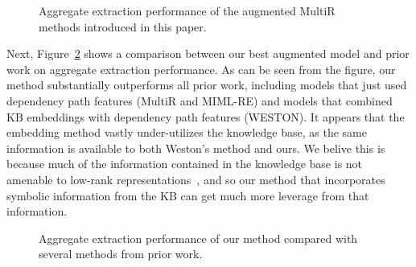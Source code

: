 \documentclass[11pt,a4paper]{article}
\newcommand{\figref}[1]{Figure~\ref{fig:#1}}
\begin{document}
\begin{figure}
  \centering
  \caption{Aggregate extraction performance of the augmented MultiR methods
  introduced in this paper.}
  \label{fig:our-comparison}
\end{figure}

Next, \figref{prior-work-comparison} shows a comparison between our best
augmented model and prior work on aggregate extraction performance.  As can be
seen from the figure, our method substantially outperforms all prior work,
including models that just used dependency path features (MultiR and MIML-RE)
and models that combined KB embeddings with dependency path features (WESTON).
It appears that the embedding method vastly under-utilizes the knowledge base,
as the same information is available to both Weston's method and ours.  We
belive this is because much of the information contained in the knowledge base
is not amenable to low-rank representations~\cite{nickel-2014-are}, and so our
method that incorporates symbolic information from the KB can get much more
leverage from that information.

\begin{figure}
  \centering
  \caption{Aggregate extraction performance of our method compared with several
  methods from prior work.}
  \label{fig:prior-work-comparison}
\end{figure}
\end{document}

